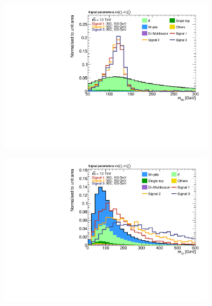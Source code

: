\begin{figure}
\begin{subfigure}[b]{0.49\linewidth}
		\caption{\label{fig:norm_mt}}
	\end{subfigure}\hfill
	\begin{subfigure}[b]{0.49\linewidth}
		\centering\includegraphics[width=\textwidth]{presel/mbb}
		\caption{\label{fig:norm_mct}}
	\end{subfigure}
	\begin{subfigure}[b]{0.49\linewidth}
		\centering\includegraphics[width=\textwidth]{presel/mlb1}
		\caption{\label{fig:norm_mt}}
	\end{subfigure}\hfill
	\begin{subfigure}[b]{0.49\linewidth}

\end{subfigure}
\end{figure}
